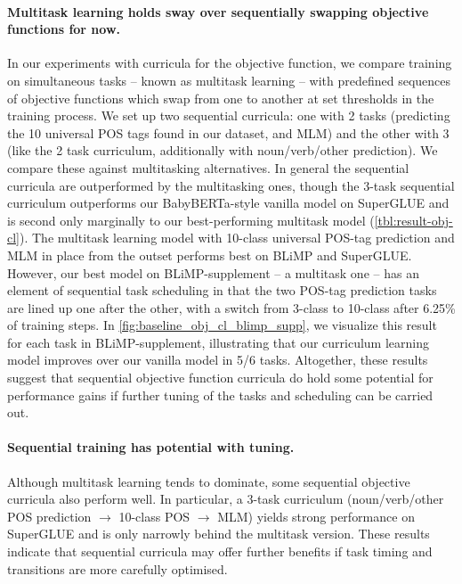 \paragraph{Multitask learning holds sway over sequentially swapping objective functions for now.}
In our experiments with curricula for the objective function, we compare training on simultaneous tasks -- known as multitask learning \cite{caruana1997multitask} -- with predefined sequences of objective functions which swap from one to another at set thresholds in the training process. We set up two sequential curricula: one with 2 tasks (predicting the 10 universal POS tags found in our dataset, and MLM) and the other with 3 (like the 2 task curriculum, additionally with noun/verb/other prediction). We compare these against multitasking alternatives. In general the sequential curricula are outperformed by the multitasking ones, though the 3-task sequential curriculum outperforms our BabyBERTa-style vanilla model on SuperGLUE and is second only marginally to our best-performing multitask model (\cref{tbl:result-obj-cl}). The multitask learning model with 10-class universal POS-tag prediction and MLM in place from the outset performs best on BLiMP and SuperGLUE. However, our best model on BLiMP-supplement -- a multitask one -- has an element of sequential task scheduling in that the two POS-tag prediction tasks are lined up one after the other, with a switch from 3-class to 10-class after 6.25\% of training steps. In \cref{fig:baseline_obj_cl_blimp_supp}, we visualize this result for each task in BLiMP-supplement, illustrating that our curriculum learning model improves over our vanilla model in 5/6 tasks.
Altogether, these results suggest that sequential objective function curricula do hold some potential for performance gains if further tuning of the tasks and scheduling can be carried out.

\paragraph{Sequential training has potential with tuning.}
Although multitask learning tends to dominate, some sequential objective curricula also perform well. In particular, a 3-task curriculum (noun/verb/other POS prediction $\rightarrow$ 10-class POS $\rightarrow$ MLM) yields strong performance on SuperGLUE and is only narrowly behind the multitask version. These results indicate that sequential curricula may offer further benefits if task timing and transitions are more carefully optimised.

